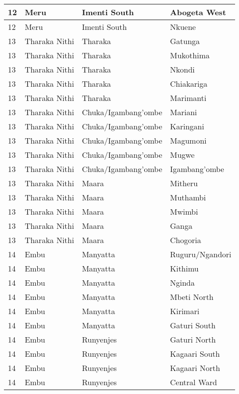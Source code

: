 \begin{table}[!ht]
\begin{tabular}{|l|l|l|l|}
        12 & Meru & Imenti South & Abogeta West \\ \hline
        12 & Meru & Imenti South & Nkuene \\ \hline
        13 & Tharaka Nithi & Tharaka  & Gatunga \\ \hline
        13 & Tharaka Nithi & Tharaka  & Mukothima \\ \hline
        13 & Tharaka Nithi & Tharaka  & Nkondi \\ \hline
        13 & Tharaka Nithi & Tharaka  & Chiakariga \\ \hline
        13 & Tharaka Nithi & Tharaka  & Marimanti \\ \hline
        13 & Tharaka Nithi & Chuka/Igambang’ombe & Mariani \\ \hline
        13 & Tharaka Nithi & Chuka/Igambang’ombe & Karingani \\ \hline
        13 & Tharaka Nithi & Chuka/Igambang’ombe & Magumoni \\ \hline
        13 & Tharaka Nithi & Chuka/Igambang’ombe & Mugwe \\ \hline
        13 & Tharaka Nithi & Chuka/Igambang’ombe & Igambang’ombe \\ \hline
        13 & Tharaka Nithi & Maara & Mitheru \\ \hline
        13 & Tharaka Nithi & Maara & Muthambi \\ \hline
        13 & Tharaka Nithi & Maara & Mwimbi \\ \hline
        13 & Tharaka Nithi & Maara & Ganga \\ \hline
        13 & Tharaka Nithi & Maara & Chogoria \\ \hline
        14 & Embu & Manyatta & Ruguru/Ngandori \\ \hline
        14 & Embu & Manyatta & Kithimu \\ \hline
        14 & Embu & Manyatta & Nginda \\ \hline
        14 & Embu & Manyatta & Mbeti North \\ \hline
        14 & Embu & Manyatta & Kirimari \\ \hline
        14 & Embu & Manyatta & Gaturi South \\ \hline
        14 & Embu & Runyenjes & Gaturi North \\ \hline
        14 & Embu & Runyenjes & Kagaari South \\ \hline
        14 & Embu & Runyenjes & Kagaari North \\ \hline
        14 & Embu & Runyenjes & Central Ward \\ \hline

\end{tabular}
\end{table}
